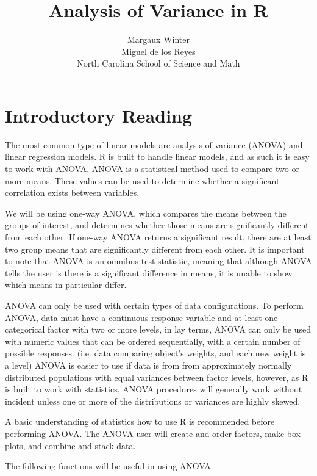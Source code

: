 \documentclass[11pt]{article}
\title{Analysis of Variance in R}
\author{Margaux Winter \\ Miguel de los Reyes \\ North Carolina School of Science and Math}
\begin{document}
\maketitle


\section{Introductory Reading}


The most common type of linear models are analysis of variance (ANOVA) and linear regression models. R is built to handle linear models, and as such it is easy to work with ANOVA. ANOVA is a statistical method used to compare two or more means. These values can be used to determine whether a significant correlation exists between variables. 

We will be using one-way ANOVA, which compares the means between the groups of interest, and determines whether those means are significantly different from each other. If one-way ANOVA returns a significant result, there are at least two group means that are significantly different from each other. It is important to note that ANOVA is an omnibus test statistic, meaning that although ANOVA tells the user is there is a significant difference in means, it is unable to show which means in particular differ.

ANOVA can only be used with certain types of data configurations. To perform ANOVA, data must have a continuous response variable and at least one categorical factor with two or more levels, in lay terms, ANOVA can only be used with numeric values that can be ordered sequentially, with a certain number of possible responses. (i.e. data comparing object's weights, and each new weight is a level) ANOVA is easier to use if data is from from approximately normally distributed populations with equal variances between factor levels, however, as R is built to work with statistics, ANOVA procedures will generally work without incident unless one or more of the distributions or variances are highly skewed.

A basic understanding of statistics how to use R is recommended before performing ANOVA. The ANOVA user will create and order factors, make box plots, and combine and stack data. 
\cite{cran-r}


The following functions will be useful in using ANOVA.
\end{document}
